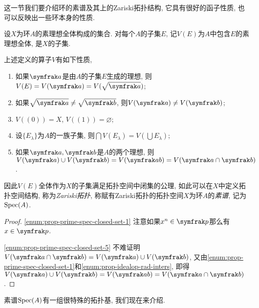 这一节我们要介绍环的素谱及其上的Zariski拓扑结构, 它具有很好的函子性质, 也可以反映出一些环本身的性质.

设$X$为环$A$的素理想全体构成的集合. 对每个$A$的子集$E$, 记$V(E)$为$A$中包含$E$的素理想全体, 是$X$的子集.

\begin{proposition}\label{prop:primespecclosedset}
  上述定义的算子$V$有如下性质,
  \begin{enumerate}
    \item\label{enum:prop-prime-spec-closed-set-1} 如果$\ideal{a}$是由$A$的子集$E$生成的理想, 则$V(E)=V(\ideal{a})=V(\sqrt{\ideal{a}})$;
    \item\label{enum:prop-prime-spec-closed-set-2} 如果$\sqrt{\ideal{a}}\neq\sqrt{\ideal{b}}$, 则$V(\ideal{a})\neq V(\ideal{b})$;
    \item\label{enum:prop-prime-spec-closed-set-3} $V((0))=X$, $V((1))=\varnothing$;
    \item\label{enum:prop-prime-spec-closed-set-4} 设$\{E_\lambda\}$为$A$的一族子集, 则$\bigcap V(E_\lambda)=V(\bigcup E_\lambda)$;
    \item\label{enum:prop-prime-spec-closed-set-5} 如果$\ideal{a}, \ideal{b}$是$A$的两个理想, 则$V(\ideal{a})\cup V(\ideal{b})=V(\ideal{ab})= V(\ideal{a}\cap \ideal{b})$.
  \end{enumerate}
  因此$V(E)$全体作为$X$的子集满足拓扑空间中闭集的公理, 如此可以在$X$中定义拓扑空间结构, 称为\emph{Zariski拓扑}, 称赋有Zariski拓扑的拓扑空间$X$为环$A$的\emph{素谱}, 记为$\operatorname{Spec} (A)$.
\end{proposition}

\begin{proof}
  \ref{enum:prop-prime-spec-closed-set-1} 注意如果$x^n\in \ideal{p}$那么有$x\in\ideal{p}$.

  \ref{enum:prop-prime-spec-closed-set-5} 不难证明$V(\ideal{a}\cap\ideal{b})=V(\ideal{a})\cup V(\ideal{b})$, 又由\ref{enum:prop-prime-spec-closed-set-1}和\ref{enum:prop-idealop-rad-inters}, 即得$V(\ideal{a})\cup V(\ideal{b})=V(\ideal{ab})= V(\ideal{a}\cap \ideal{b})$.
\end{proof}

素谱$\operatorname{Spec} (A)$有一组很特殊的拓扑基, 我们现在来介绍.

